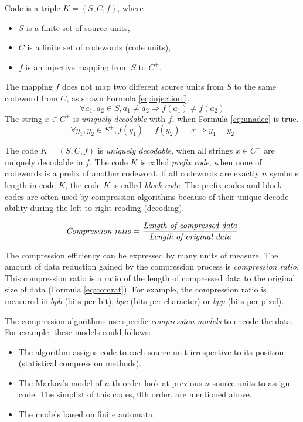 \documentclass[thesis=M,english]{FITthesis}[2012/10/20]
\begin{document}
Code is a triple $K=(S,C,f)$, where

\begin{itemize}
	\item $S$ is a finite set of source units,
	\item $C$ is a finite set of codewords (code units),
	\item $f$ is an injective mapping from $S$ to $C^+$.
\end{itemize}
The mapping $f$ does not map two different source units from $S$ to the same codeword from $C$, as shown Formula \ref{eq:injectionf}.
\begin{equation} \label{eq:injectionf}
\forall a_1,a_2 \in S,a_1 \neq a_2 \Rightarrow f(a_1) \neq f(a_2)
\end{equation}
The string $x \in C^+$ is \textit{uniquely decodable} with $f$, when Formula \ref{eq:unadec} is true.
\begin{equation} \label{eq:unadec}
\forall y_1,y_2 \in S^+,f(y_1)=f(y_2)=x \Rightarrow y_1=y_2
\end{equation}

The code $K=(S,C,f)$ is \textit{uniquely decodable}, when all strings $x \in C^+$ are uniquely decodable  in $f$. The code $K$ is called \textit{prefix code}, when none of codewords is a prefix of another codeword. If all codewords are exactly $n$ symbols length in code $K$, the code $K$ is called \textit{block code}. The prefix codes and block codes are often used by compression algorithms because of their unique decode-ability during the left-to-right reading (decoding).

\begin{equation} \label{eq:comrat}
\textrm{\textit{Compression ratio}} = \frac{\textrm{\textit{Length of compressed data}}}{\textrm{\textit{Length of original data}}}
\end{equation}

The compression efficiency can be expressed by many units of measure. The amount of data reduction gained by the compression process is \textit{compression ratio}. This compression ratio is a ratio of the length of compressed data to the original size of data (Formula \ref{eq:comrat}).
For example, the compression ratio is measured in $bpb$ (bits per bit), $bpc$ (bits per character) or $bpp$ (bits per pixel). 

The compression algorithms use specific \textit{compression models} to encode the data. For example, these models could follows:
\begin{itemize}
	\item The algorithm assigns code to each source unit irrespective to its position (statistical compression methods).
	\item The Markov's model of $n$-th order look at previous $n$ source units to assign code. The simplist of this codes, 0th order, are mentioned above.
	\item The models based on finite automata.
\end{itemize}
\end{document}
